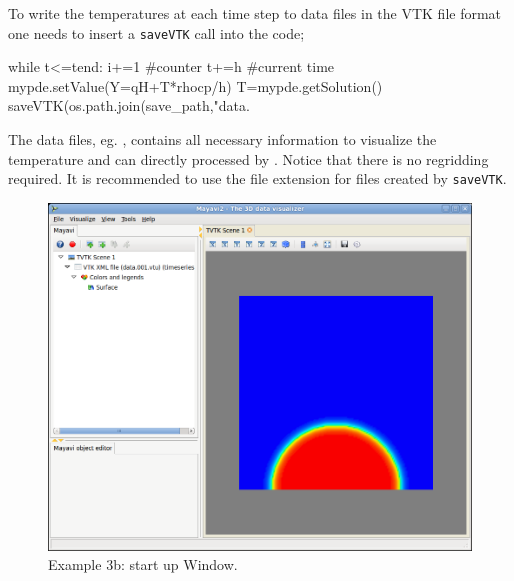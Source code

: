 To write the temperatures at each time step to data files in the VTK file format
one
needs to insert a \verb|saveVTK| call into the code;
\begin{python}
while t<=tend:
      i+=1 #counter
      t+=h #current time
      mypde.setValue(Y=qH+T*rhocp/h)
      T=mypde.getSolution()
      saveVTK(os.path.join(save_path,"data.%
\end{python}
The data files, eg. , contains all necessary information to 
visualize the temperature and can directly processed by \mayavi. Notice that
there is no 
regridding required. It is recommended to use the file extension  for
files
created by \verb|saveVTK|. 

\begin{figure}[ht]
\centerline{\includegraphics[width=4.in]{figures/ScreeshotMayavi2n1}}
\caption{Example 3b: \mayavi start up Window.}
\label{fig:mayavi window}
\end{figure}

